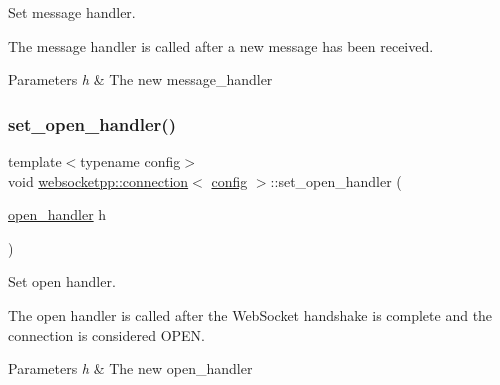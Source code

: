 Set message handler. 

The message handler is called after a new message has been received.


\begin{DoxyParams}{Parameters}
{\em h} & The new message\+\_\+handler \\
\hline
\end{DoxyParams}
\mbox{\label{classwebsocketpp_1_1connection_ab11271e7778fbfde3a1987fca729af6d}} 
\subsubsection{\texorpdfstring{set\+\_\+open\+\_\+handler()}{set\_open\_handler()}}
{\footnotesize\ttfamily template$<$typename config$>$ \\
void \mbox{\hyperlink{classwebsocketpp_1_1connection}{websocketpp\+::connection}}$<$ \mbox{\hyperlink{classconfig}{config}} $>$\+::set\+\_\+open\+\_\+handler (\begin{DoxyParamCaption}\item[{\mbox{\hyperlink{namespacewebsocketpp_a53c8b4ae59cf13b5f883b119bbd14d72}{open\+\_\+handler}}}]{h }\end{DoxyParamCaption})\hspace{0.3cm}{\ttfamily [inline]}}



Set open handler. 

The open handler is called after the Web\+Socket handshake is complete and the connection is considered O\+P\+EN.


\begin{DoxyParams}{Parameters}
{\em h} & The new open\+\_\+handler \\
\hline
\end{DoxyParams}
\mbox{\label{classwebsocketpp_1_1connection_ad5a666fe1144dc68b1bae3bcc615e1ed}} 
